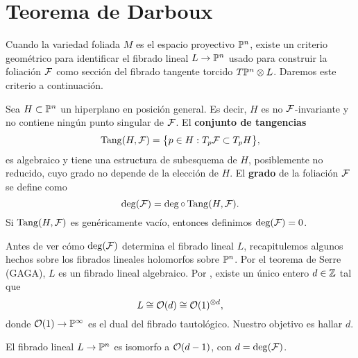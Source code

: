 \section{Teorema de Darboux}

Cuando la variedad foliada $M$ es el espacio proyectivo $\P^n$, existe un criterio geométrico para identificar el fibrado lineal $L \to \P^n$ usado para construir la foliación $\F$ como sección del fibrado tangente torcido $T\P^n \otimes L$. Daremos este criterio a continuación.

Sea $H \subset \P^n$ un hiperplano en posición general. Es decir, $H$ es no $\F$-invariante y no contiene ningún punto singular de $\F$. El \textbf{conjunto de tangencias}
$$\Tang(H, \F) = \big \{ p \in H : T_p \F \subset T_pH \big \},$$
es algebraico y tiene una estructura de subesquema de $H$, posiblemente no reducido, cuyo grado no depende de la elección de $H$. El \textbf{grado} de la foliación $\F$ se define como
$$\deg(\F) = \deg \circ \Tang(H, \F).$$
Si $\Tang(H, \F)$ es genéricamente vacío, entonces definimos $\deg(\F) = 0$.

Antes de ver cómo $\deg(\F)$ determina el fibrado lineal $L$, recapitulemos algunos hechos sobre los fibrados lineales holomorfos sobre $\P^n$. Por el teorema de Serre (GAGA), $L$ es un fibrado lineal algebraico. Por \cite[p. 145, cor. 6.17]{hartshorne}, existe un único entero $d \in \Z$ tal que
$$L \cong \O(d) \cong \O(1)^{\otimes d},$$
donde $\O(1) \to \P^\infty$ es el dual del fibrado tautológico. Nuestro objetivo es hallar $d$.

\begin{lemma}
El fibrado lineal $L \to \P^n$ es isomorfo a $\O(d-1)$, con $d = \deg(\F)$.
\end{lemma}

